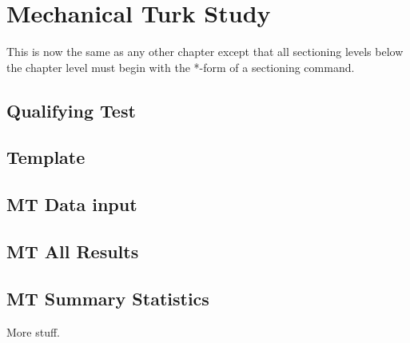 \chapter{Mechanical Turk Study}

This is now the same as any other chapter except that
all sectioning levels below the chapter level must begin
with the *-form of a sectioning command.

\section*{Qualifying Test}
\section*{Template}
\section*{MT Data input}
\section*{MT All Results}
\section*{MT Summary Statistics}

More stuff.
